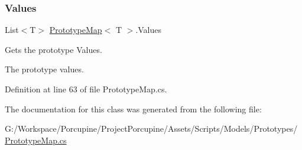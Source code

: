 \subsubsection{\texorpdfstring{Values}{Values}}
{\footnotesize\ttfamily List$<$T$>$ \hyperlink{class_prototype_map}{Prototype\+Map}$<$ T $>$.Values\hspace{0.3cm}{\ttfamily [get]}}



Gets the prototype Values. 

The prototype values.

Definition at line 63 of file Prototype\+Map.\+cs.



The documentation for this class was generated from the following file\+:\begin{DoxyCompactItemize}
\item 
G\+:/\+Workspace/\+Porcupine/\+Project\+Porcupine/\+Assets/\+Scripts/\+Models/\+Prototypes/\hyperlink{_prototype_map_8cs}{Prototype\+Map.\+cs}\end{DoxyCompactItemize}
